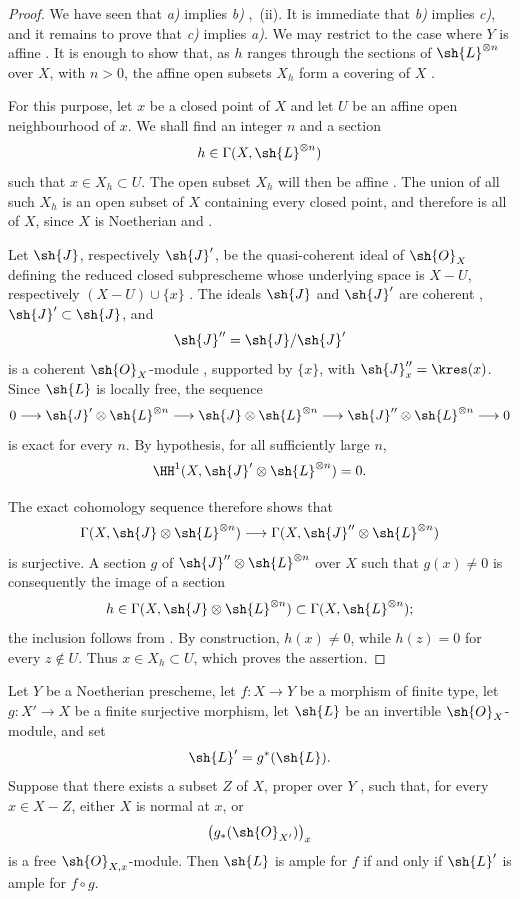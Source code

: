 \begin{proof}
We have seen that \emph{a)} implies \emph{b)} ,~(ii).
It is immediate that \emph{b)} implies \emph{c)}, and it remains to prove
that \emph{c)} implies \emph{a)}.
We may restrict to the case where $Y$ is affine .
It is enough to show that, as $h$ ranges through the sections of
$\sh{L}^{\otimes n}$ over $X$, with $n>0$, the affine open subsets $X_h$
form a covering of $X$ .

For this purpose, let $x$ be a closed point of $X$ and let $U$ be an
affine open neighbourhood of $x$.
We shall find an integer $n$ and a section
\[
  h\in\Gamma(X,\sh{L}^{\otimes n})
\]
such that $x\in X_h\subset U$.
The open subset $X_h$ will then be affine .
The union of all such $X_h$ is an open subset of $X$ containing every
closed point, and therefore is all of $X$, since $X$ is Noetherian
 and .

Let $\sh{J}$, respectively $\sh{J}'$, be the quasi-coherent ideal of
$\sh{O}_X$ defining the reduced closed subprescheme whose underlying
space is $X-U$, respectively $(X-U)\cup\{x\}$ .
The ideals $\sh{J}$ and $\sh{J}'$ are coherent ,
$\sh{J}'\subset\sh{J}$, and
\[
  \sh{J}''=\sh{J}/\sh{J}'
\]
is a coherent $\sh{O}_X$-module , supported by
$\{x\}$, with $\sh{J}''_x=\kres(x)$.
Since $\sh{L}$ is locally free, the sequence
\[
  0\longrightarrow
  \sh{J}'\otimes\sh{L}^{\otimes n}
  \longrightarrow
  \sh{J}\otimes\sh{L}^{\otimes n}
  \longrightarrow
  \sh{J}''\otimes\sh{L}^{\otimes n}
  \longrightarrow0
\]
is exact for every $n$.
By hypothesis, for all sufficiently large $n$,
\[
  \HH^1(X,\sh{J}'\otimes\sh{L}^{\otimes n})=0.
\]


The exact cohomology sequence therefore shows that
\[
  \Gamma(X,\sh{J}\otimes\sh{L}^{\otimes n})
  \longrightarrow
  \Gamma(X,\sh{J}''\otimes\sh{L}^{\otimes n})
\]
is surjective.
A section $g$ of $\sh{J}''\otimes\sh{L}^{\otimes n}$ over $X$ such that
$g(x)\neq0$ is consequently the image of a section
\[
  h\in\Gamma(X,\sh{J}\otimes\sh{L}^{\otimes n})
  \subset\Gamma(X,\sh{L}^{\otimes n});
\]
the inclusion follows from .
By construction, $h(x)\neq0$, while $h(z)=0$ for every $z\notin U$.
Thus $x\in X_h\subset U$, which proves the assertion.
\end{proof}

\begin{proposition}[2.6.2]
\label{III.2.6.2}
Let $Y$ be a Noetherian prescheme, let $f:X\to Y$ be a morphism of
finite type, let $g:X'\to X$ be a finite surjective morphism, let
$\sh{L}$ be an invertible $\sh{O}_X$-module, and set
\[
  \sh{L}'=g^*(\sh{L}).
\]
Suppose that there exists a subset $Z$ of $X$, proper over $Y$
, such that, for every $x\in X-Z$, either $X$ is
normal at $x$, or
\[
  \bigl(g_*(\sh{O}_{X'})\bigr)_x
\]
is a free $\sh{O}_{X,x}$-module.
Then $\sh{L}$ is ample for $f$ if and only if $\sh{L}'$ is ample for
$f\circ g$.
\end{proposition}

